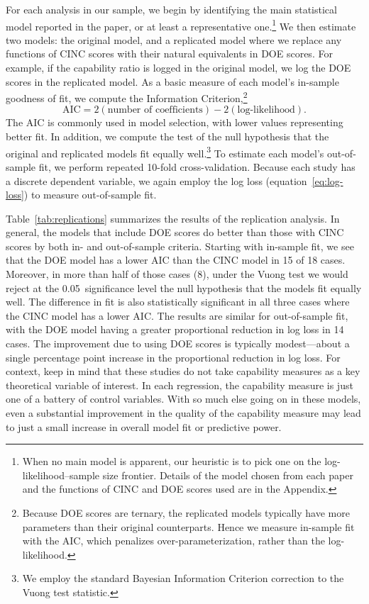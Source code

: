 For each analysis in our sample, we begin by identifying the main statistical model reported in the paper, or at least a representative one.\footnote{%
  When no main model is apparent, our heuristic is to pick one on the log-likelihood--sample size frontier.
  Details of the model chosen from each paper and the functions of CINC and DOE scores used are in the Appendix.
}
We then estimate two models: the original model, and a replicated model where we replace any functions of CINC scores with their natural equivalents in DOE scores.
For example, if the capability ratio is logged in the original model, we log the DOE scores in the replicated model.
As a basic measure of each model's in-sample goodness of fit, we compute the \citet{Akaike:1974ih} Information Criterion,\footnote{%
  Because DOE scores are ternary, the replicated models typically have more parameters than their original counterparts.
  Hence we measure in-sample fit with the AIC, which penalizes over-parameterization, rather than the log-likelihood.
}
\begin{displaymath}
  \text{AIC}
  =
  2(\text{number of coefficients}) - 2(\text{log-likelihood}).
\end{displaymath}
The AIC is commonly used in model selection, with lower values representing better fit.
In addition, we compute the \citet{Vuong:1989uf} test of the null hypothesis that the original and replicated models fit equally well.\footnote{%
  We employ the standard Bayesian Information Criterion \citep{Schwarz:1978kh} correction to the Vuong test statistic.
}
To estimate each model's out-of-sample fit, we perform repeated 10-fold cross-validation.
Because each study has a discrete dependent variable, we again employ the log loss (equation~\eqref{eq:log-loss}) to measure out-of-sample fit.

Table~\ref{tab:replications} summarizes the results of the replication analysis.
In general, the models that include DOE scores do better than those with CINC scores by both in- and out-of-sample criteria.
Starting with in-sample fit, we see that the DOE model has a lower AIC than the CINC model in 15 of 18 cases.
Moreover, in more than half of those cases (8), under the Vuong test we would reject at the 0.05~significance level the null hypothesis that the models fit equally well.
The difference in fit is also statistically significant in all three cases where the CINC model has a lower AIC.
The results are similar for out-of-sample fit, with the DOE model having a greater proportional reduction in log loss in 14 cases.
The improvement due to using DOE scores is typically modest---about a single percentage point increase in the proportional reduction in log loss.
For context, keep in mind that these studies do not take capability measures as a key theoretical variable of interest.
In each regression, the capability measure is just one of a battery of control variables.
With so much else going on in these models, even a substantial improvement in the quality of the capability measure may lead to just a small increase in overall model fit or predictive power.

